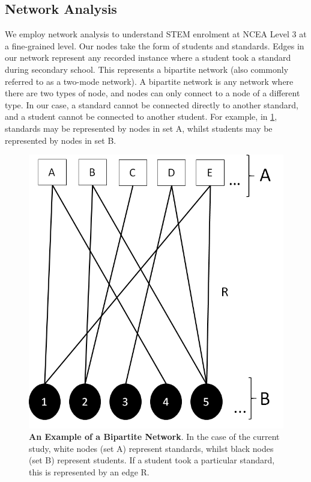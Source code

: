 \documentclass[a4paper]{article}
\begin{document}
\subsection{Network Analysis}
We employ network analysis to understand STEM enrolment at NCEA Level 3 at a fine-grained level. Our nodes take the form of students and standards. Edges in our network represent any recorded instance where a student took a standard during secondary school. This represents a bipartite network (also commonly referred to as a two-mode network). A bipartite network is any network where there are two types of node, and nodes can only connect to a node of a different type. In our case, a standard cannot be connected directly to another standard, and a student cannot be connected to another student. For example, in \ref{fig:BipariteNetwork}, standards may be represented by nodes in set A, whilst students may be represented by nodes in set B.
\begin{figure}
    \centering
    \includegraphics{Bipartite_Network.png}
    \caption{\textbf{An Example of a Bipartite Network}. In the case of the current study, white nodes (set A) represent standards, whilst black nodes (set B) represent students. If a student took a particular standard, this is represented by an edge R.}
    \label{fig:BipariteNetwork}
\end{figure}
\end{document}
